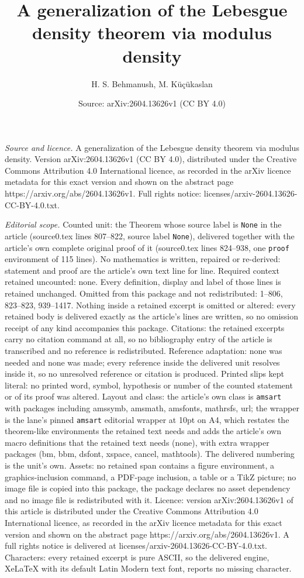 \documentclass[10pt,a4paper]{amsart}
\title[A generalization of the Lebesgue density theorem via modulus]{A generalization of the Lebesgue density theorem via modulus density}
\author{H. S. Behmanush, M. K\"u\c{c}\"ukaslan}
\date{Source: arXiv:2604.13626v1 (CC BY 4.0)}
\begin{document}
\maketitle

\noindent\emph{Source and licence.} A generalization of the Lebesgue density theorem via modulus density. Version arXiv:2604.13626v1 (CC BY 4.0), distributed under the Creative Commons Attribution 4.0 International licence, as recorded in the arXiv licence metadata for this exact version and shown on the abstract page https://arxiv.org/abs/2604.13626v1. Full rights notice: licenses/arxiv-2604.13626-CC-BY-4.0.txt.\par\smallskip

\noindent\textit{Editorial scope.} Counted unit: the Theorem whose source label is \texttt{None} in the article (source0.tex lines 807--822, source label \texttt{None}), delivered together with the article's own complete original proof of it (source0.tex lines 824--938, one \texttt{proof} environment of 115 lines). No mathematics is written, repaired or re-derived: statement and proof are the article's own text line for line. Required context retained uncounted: none. Every definition, display and label of those lines is retained unchanged. Omitted from this package and not redistributed: 1--806, 823--823, 939--1417. Nothing inside a retained excerpt is omitted or altered: every retained body is delivered exactly as the article's lines are written, so no omission receipt of any kind accompanies this package. Citations: the retained excerpts carry no citation command at all, so no bibliography entry of the article is transcribed and no reference is redistributed. Reference adaptation: none was needed and none was made; every reference inside the delivered unit resolves inside it, so no unresolved reference or citation is produced. Printed slips kept literal: no printed word, symbol, hypothesis or number of the counted statement or of its proof was altered. Layout and class: the article's own class is \texttt{amsart} with packages including amssymb, amsmath, amsfonts, mathrsfs, url; the wrapper is the lane's pinned \texttt{amsart} editorial wrapper at 10pt on A4, which restates the theorem-like environments the retained text needs and adds the article's own macro definitions that the retained text needs (none), with extra wrapper packages (bm, bbm, dsfont, xspace, cancel, mathtools). The delivered numbering is the unit's own. Assets: no retained span contains a figure environment, a graphics-inclusion command, a PDF-page inclusion, a table or a TikZ picture; no image file is copied into this package, the package declares no asset dependency and no image file is redistributed with it. Licence: version arXiv:2604.13626v1 of this article is distributed under the Creative Commons Attribution 4.0 International licence, as recorded in the arXiv licence metadata for this exact version and shown on the abstract page https://arxiv.org/abs/2604.13626v1. A full rights notice is delivered at licenses/arxiv-2604.13626-CC-BY-4.0.txt. Characters: every retained excerpt is pure ASCII, so the delivered engine, XeLaTeX with its default Latin Modern text font, reports no missing character.
\end{document}
